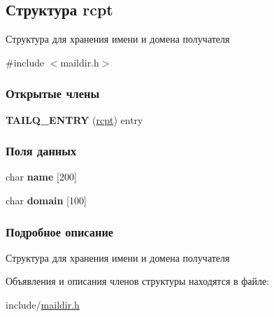 \hypertarget{structrcpt}{\subsection{Структура rcpt}
\label{structrcpt}
}


Структура для хранения имени и домена получателя  




{\ttfamily \#include $<$maildir.\-h$>$}

\subsubsection*{Открытые члены}
\begin{DoxyCompactItemize}
\item 
\hypertarget{structrcpt_a31825e5290a4192e322a1505a92e419e}{{\bfseries T\-A\-I\-L\-Q\-\_\-\-E\-N\-T\-R\-Y} (\hyperlink{structrcpt}{rcpt}) entry}\label{structrcpt_a31825e5290a4192e322a1505a92e419e}

\end{DoxyCompactItemize}
\subsubsection*{Поля данных}
\begin{DoxyCompactItemize}
\item 
\hypertarget{structrcpt_ad9fabbb0637a3898714b29d6d1d8b2f1}{char {\bfseries name} \mbox{[}200\mbox{]}}\label{structrcpt_ad9fabbb0637a3898714b29d6d1d8b2f1}

\item 
\hypertarget{structrcpt_a631a89959f28dc2b4599ec4ba84d2911}{char {\bfseries domain} \mbox{[}100\mbox{]}}\label{structrcpt_a631a89959f28dc2b4599ec4ba84d2911}

\end{DoxyCompactItemize}


\subsubsection{Подробное описание}
Структура для хранения имени и домена получателя 

Объявления и описания членов структуры находятся в файле\-:\begin{DoxyCompactItemize}
\item 
include/\hyperlink{maildir_8h}{maildir.\-h}\end{DoxyCompactItemize}
